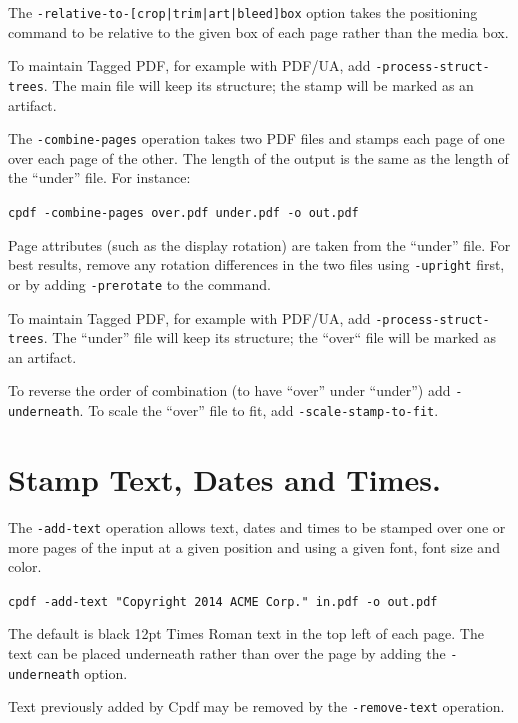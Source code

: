 \documentclass{book}
\begin{document}
The \texttt{-relative-to-[crop|trim|art|bleed]box} option takes the positioning command to be relative to the given box of each page rather than the media box.

To maintain Tagged PDF, for example with PDF/UA, add \texttt{-process-struct-trees}. The main file will keep its structure; the stamp will be marked as an artifact.

  The \texttt{-combine-pages} operation takes two PDF files and stamps each
page of one over each page of the other. The length of the output is the same
as the length of the ``under'' file. For instance:

  \begin{framed}
    \noindent\small\verb!cpdf -combine-pages over.pdf under.pdf -o out.pdf!
  \end{framed}

\noindent Page attributes (such as the display rotation) are taken from the ``under''
file. For best results, remove any rotation differences in the two files using
\texttt{-upright} first, or by adding \texttt{-prerotate} to the command.

To maintain Tagged PDF, for example with PDF/UA, add \texttt{-process-struct-trees}. The ``under'' file will keep its structure; the ``over`` file will be marked as an artifact.

To reverse the order of combination (to have ``over'' under ``under'') add \texttt{-underneath}. To scale the ``over'' file to fit, add \texttt{-scale-stamp-to-fit}.

  \section{Stamp Text, Dates and Times.}
  The \texttt{-add-text} operation allows text, dates and times to be stamped
over one or more pages of the input at a given position and using a given font,
font size and color.

  \begin{framed}
    \noindent\small\verb!cpdf -add-text "Copyright 2014 ACME Corp." in.pdf -o out.pdf!
  \end{framed}

  \noindent The default is black 12pt Times Roman text in the top left of each page. The text can be placed underneath rather than over the page by adding the \texttt{-underneath} option.
  
  Text previously added by Cpdf may be removed by the \texttt{-remove-text} operation.
\end{document}
